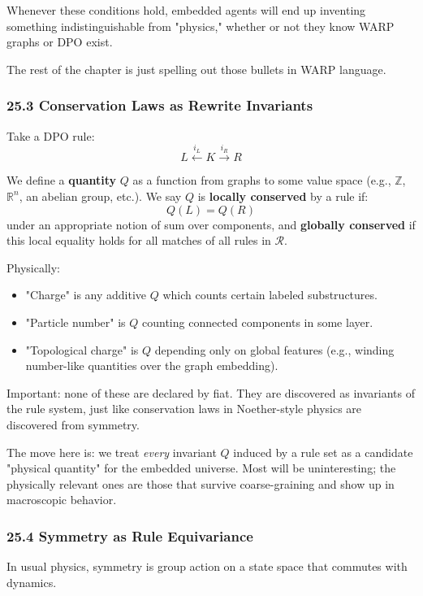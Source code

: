 Whenever these conditions hold, embedded agents will end up inventing something
indistinguishable from "physics," whether or not they know WARP graphs or DPO exist.

The rest of the chapter is just spelling out those bullets in WARP language.

\subsubsection*{25.3  Conservation Laws as Rewrite Invariants}

Take a DPO rule:
\[
  L \xleftarrow{i_L} K \xrightarrow{i_R} R
\]

We define a \textbf{quantity} $Q$ as a function from graphs to some value space
(e.g., $\mathbb{Z}$, $\mathbb{R}^n$, an abelian group, etc.).
We say $Q$ is \textbf{locally conserved} by a rule if:
\[
  Q(L) = Q(R)
\]
under an appropriate notion of sum over components, and \textbf{globally conserved}
if this local equality holds for all matches of all rules in $\mathcal{R}$.

Physically:

\begin{itemize}
  \item "Charge" is any additive $Q$ which counts certain labeled substructures.
  \item "Particle number" is $Q$ counting connected components in some layer.
  \item "Topological charge" is $Q$ depending only on global features
        (e.g., winding number-like quantities over the graph embedding).
\end{itemize}

Important: none of these are declared by fiat. They are discovered as invariants
of the rule system, just like conservation laws in Noether-style physics are
discovered from symmetry.

The move here is: we treat \emph{every} invariant $Q$ induced by a rule set
as a candidate "physical quantity" for the embedded universe. Most will be
uninteresting; the physically relevant ones are those that survive coarse-graining
and show up in macroscopic behavior.

\subsubsection*{25.4  Symmetry as Rule Equivariance}

In usual physics, symmetry is group action on a state space that commutes with dynamics.

